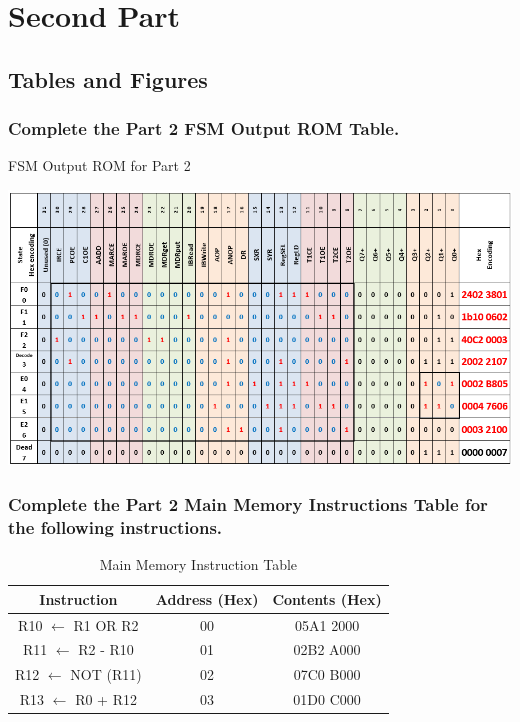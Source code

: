\documentclass{article}
\begin{document}
	\pagebreak
	
	\section{Second Part}
	\subsection{Tables and Figures}
	\subsubsection{Complete the Part 2 FSM Output ROM Table.}
	\begin{table}[!ht]
		\centering
		\caption{FSM Output ROM for Part 2}
		\vspace{0.2cm}
		\includegraphics[width=0.72\textheight]{fsm_output_part2.png}	
	\end{table}

	\subsubsection{Complete the Part 2 Main Memory Instructions Table for the following instructions.}
	\begin{table}[!ht]
		\centering
		\caption{Main Memory Instruction Table}
		\vspace{0.2cm}
		\begin{tabular}{|c|c|c|}
			\hline
			Instruction & Address (Hex) & Contents (Hex)\\
			\hline\hline
			R10 $\leftarrow$ R1 OR R2 & 00 & 05A1 2000\\
			\hline
			R11 $\leftarrow$ R2 - R10 & 01 & 02B2 A000\\
			\hline
			R12 $\leftarrow$ NOT (R11) & 02 & 07C0 B000\\
			\hline
			R13 $\leftarrow$ R0 + R12 & 03 & 01D0 C000\\
			\hline
		\end{tabular}
	\end{table}
\end{document}
